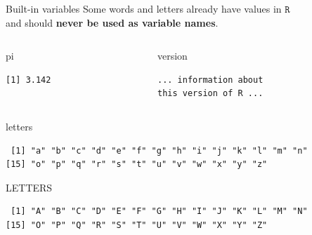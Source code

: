 \documentclass[
  11pt,
  ignorenonframetext,
]{beamer}
\newenvironment{Shaded}{\begin{snugshade}}{\end{snugshade}}
\newcommand{\NormalTok}[1]{#1}
\begin{document}
\begin{frame}[fragile]{Built-in variables}
\protect\hypertarget{built-in-variables}{}
Some words and letters already have values in \(\texttt{R}\)\\
and should \textbf{never be used as variable names}.

\begin{columns}[T,onlytextwidth]
\begin{column}{0.45\textwidth}
\begin{Shaded}
\begin{Highlighting}[]
\NormalTok{pi}
\end{Highlighting}
\end{Shaded}

\begin{verbatim}
[1] 3.142
\end{verbatim}
\end{column}

\begin{column}{0.45\textwidth}
\begin{Shaded}
\begin{Highlighting}[]
\NormalTok{version}
\end{Highlighting}
\end{Shaded}

\begin{verbatim}
... information about 
this version of R ...
\end{verbatim}
\end{column}
\end{columns}

\begin{Shaded}
\begin{Highlighting}[]
\NormalTok{letters}
\end{Highlighting}
\end{Shaded}

\begin{verbatim}
 [1] "a" "b" "c" "d" "e" "f" "g" "h" "i" "j" "k" "l" "m" "n"
[15] "o" "p" "q" "r" "s" "t" "u" "v" "w" "x" "y" "z"
\end{verbatim}

\begin{Shaded}
\begin{Highlighting}[]
\NormalTok{LETTERS}
\end{Highlighting}
\end{Shaded}

\begin{verbatim}
 [1] "A" "B" "C" "D" "E" "F" "G" "H" "I" "J" "K" "L" "M" "N"
[15] "O" "P" "Q" "R" "S" "T" "U" "V" "W" "X" "Y" "Z"
\end{verbatim}
\end{frame}
\end{document}
